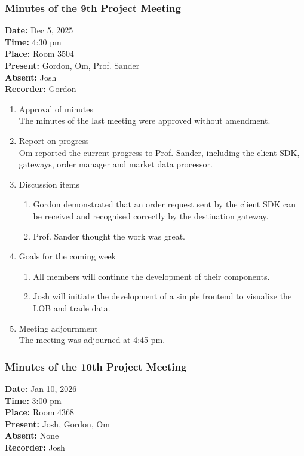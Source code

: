 \documentclass[12pt,a4paper]{article}
\begin{document}
\subsubsection{Minutes of the 9th Project Meeting}
\textbf{Date:} Dec 5, 2025\\
\textbf{Time:} 4:30 pm\\
\textbf{Place:} Room 3504\\
\textbf{Present:} Gordon, Om, Prof. Sander\\
\textbf{Absent:} Josh\\
\textbf{Recorder:} Gordon

\begin{enumerate}
\item Approval of minutes\\
The minutes of the last meeting were approved without amendment.\\
\item Report on progress\\
Om reported the current progress to Prof. Sander, including the client SDK, gateways, order manager and market data processor.\\
\item Discussion items
\begin{enumerate}
\item Gordon demonstrated that an order request sent by the client SDK can be received and recognised correctly by the destination gateway.\\
\item Prof. Sander thought the work was great.\\
\end{enumerate}
\item Goals for the coming week
\begin{enumerate}
\item All members will continue the development of their components.\\
\item Josh will initiate the development of a simple frontend to visualize the LOB and trade data.\\
\end{enumerate}
\item Meeting adjournment\\
The meeting was adjourned at 4:45 pm.
\end{enumerate}

\subsubsection{Minutes of the 10th Project Meeting}
\textbf{Date:} Jan 10, 2026\\
\textbf{Time:} 3:00 pm\\
\textbf{Place:} Room 4368\\
\textbf{Present:} Josh, Gordon, Om\\
\textbf{Absent:} None\\
\textbf{Recorder:} Josh
\end{document}
